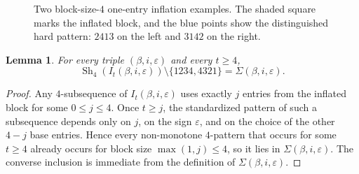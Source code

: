 \documentclass[11pt]{amsart}
\newcommand{\Sh}{\operatorname{Sh}}
\theoremstyle{plain}
\newtheorem{lemma}[theorem]{Lemma}
\theoremstyle{definition}
\theoremstyle{remark}
\begin{document}
\begin{figure}[ht]
  \centering
  \caption{Two block-size-$4$ one-entry inflation examples.  The shaded square
    marks the inflated block, and the blue points show the distinguished hard pattern: $2413$ on the
    left and $3142$ on the right.}
  \label{fig:stable-shadow-examples}
\end{figure}

\begin{lemma}\label{lem:stable-oneblock-shadow}
  For every triple $(\beta,i,\varepsilon)$ and every $t \geq 4$,
  \[
    \Sh_4(I_t(\beta,i,\varepsilon))\setminus\{1234,4321\}=\Sigma(\beta,i,\varepsilon).
  \]
\end{lemma}

\begin{proof}
  Any $4$-subsequence of $I_t(\beta,i,\varepsilon)$ uses exactly $j$ entries from the inflated block
  for some $0 \leq j \leq 4$.  Once $t \geq j$, the standardized pattern of such a subsequence depends
  only on $j$, on the sign $\varepsilon$, and on the choice of the other $4-j$ base entries.  Hence
  every non-monotone $4$-pattern that occurs for some $t \geq 4$ already occurs for block size
  $\max(1,j) \leq 4$, so it lies in $\Sigma(\beta,i,\varepsilon)$.  The converse inclusion is
  immediate from the definition of $\Sigma(\beta,i,\varepsilon)$.
\end{proof}
\end{document}

